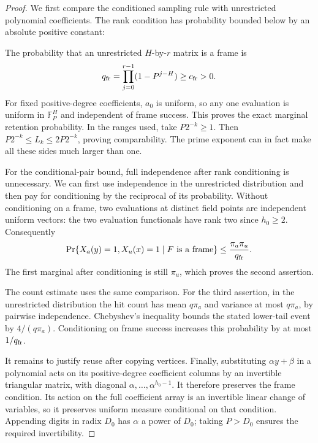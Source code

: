 \begin{proof}
We first compare the conditioned sampling rule with unrestricted polynomial coefficients. The rank condition has probability bounded below by an absolute positive constant:
\par
The probability that an unrestricted $H$-by-$r$ matrix is a frame is
\[
q_{\rm fr}=\prod_{j=0}^{r-1}(1-P^{j-H})\ge c_{\rm fr}>0.
\]
For fixed positive-degree coefficients, $a_0$ is uniform, so any one
evaluation is uniform in $\mathbb F_P^H$ and independent of frame
success. This proves the exact marginal retention probability.
In the ranges used, take $P2^{-k}\ge1$. Then
$P2^{-k}\le L_k\le2P2^{-k}$, proving comparability. The prime
exponent can in fact make all these sides much larger than one.

For the conditional-pair bound, full independence after rank conditioning is unnecessary. We can first use independence in the unrestricted distribution and then pay for conditioning by the reciprocal of its probability. Without conditioning on a frame, two evaluations at distinct field
points are independent uniform vectors: the two evaluation functionals
have rank two since $h_0\ge2$. Consequently
\[
\Pr\{X_a(y)=1,X_u(x)=1\mid F\text{ is a frame}\}
\le \frac{\pi_a\pi_u}{q_{\rm fr}}.
\]
The first marginal after conditioning is still $\pi_u$, which proves
the second assertion.

The count estimate uses the same comparison. For the third assertion, in the unrestricted distribution the hit count
has mean $q\pi_a$ and variance at most $q\pi_a$, by pairwise
independence. Chebyshev's inequality bounds the stated lower-tail event
by $4/(q\pi_a)$. Conditioning on frame success increases this probability
by at most $1/q_{\rm fr}$.

It remains to justify reuse after copying vertices. Finally, substituting $\alpha y+\beta$ in a polynomial acts on its
positive-degree coefficient columns by an invertible triangular
matrix, with diagonal $\alpha,\ldots,\alpha^{h_0-1}$.
It therefore preserves the frame condition. Its action on the full
coefficient array is an invertible linear change of variables, so it
preserves uniform measure conditional on that condition. Appending
digits in radix $D_0$ has $\alpha$ a power of $D_0$; taking
$P>D_0$ ensures the required invertibility.
\end{proof}

